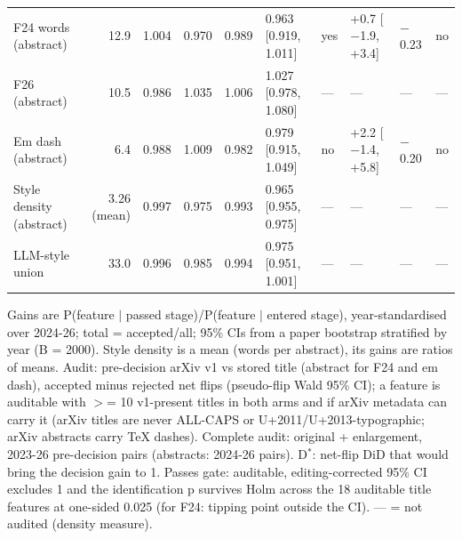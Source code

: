 \begin{table}[t]
\begin{tabular}{l r r r r l l l l l}
F24 words (abstract) & 12.9 & 1.004 & 0.970 & 0.989 & 0.963 [0.919, 1.011] & yes & +0.7 [$-$1.9, +3.4] & $-$0.23 & no \\
F26 (abstract) & 10.5 & 0.986 & 1.035 & 1.006 & 1.027 [0.978, 1.080] & --- & --- & --- & --- \\
Em dash (abstract) & 6.4 & 0.988 & 1.009 & 0.982 & 0.979 [0.915, 1.049] & no & +2.2 [$-$1.4, +5.8] & $-$0.20 & no \\
Style density (abstract) & 3.26 (mean) & 0.997 & 0.975 & 0.993 & 0.965 [0.955, 0.975] & --- & --- & --- & --- \\
LLM-style union & 33.0 & 0.996 & 0.985 & 0.994 & 0.975 [0.951, 1.001] & --- & --- & --- & --- \\
\bottomrule
\end{tabular}
\par\smallskip
\parbox{\linewidth}{\scriptsize Gains are P(feature $|$ passed stage)/P(feature $|$ entered stage), year-standardised over 2024-26; total = accepted/all; 95\% CIs from a paper bootstrap stratified by year (B = 2000). Style density is a mean (words per abstract), its gains are ratios of means. Audit: pre-decision arXiv v1 vs stored title (abstract for F24 and em dash), accepted minus rejected net flips (pseudo-flip Wald 95\% CI); a feature is auditable with $>$= 10 v1-present titles in both arms and if arXiv metadata can carry it (arXiv titles are never ALL-CAPS or U+2011/U+2013-typographic; arXiv abstracts carry TeX dashes). Complete audit: original + enlargement, 2023-26 pre-decision pairs (abstracts: 2024-26 pairs). D$^{*}$: net-flip DiD that would bring the decision gain to 1. Passes gate: auditable, editing-corrected 95\% CI excludes 1 and the identification p survives Holm across the 18 auditable title features at one-sided 0.025 (for F24: tipping point outside the CI). --- = not audited (density measure).}
\end{table}
